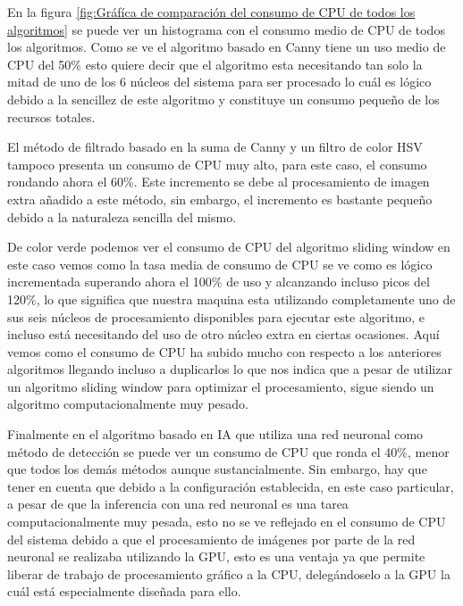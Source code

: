 \bigskip 

 En la figura \ref{fig:Gráfíca de comparación del consumo de CPU de todos los algoritmos}  se puede ver un histograma con el consumo medio de \ac{CPU} de todos los algoritmos. Como se ve el algoritmo basado en Canny tiene un uso medio de \ac{CPU} del 50\% esto quiere decir que el algoritmo esta necesitando tan solo la mitad de uno de los 6 núcleos del sistema para ser procesado lo cuál es lógico debido a la sencillez de este algoritmo y constituye un consumo pequeño de los recursos totales.
 
\bigskip

El método de filtrado basado en la suma de Canny y un filtro de color  HSV tampoco presenta un consumo de \ac{CPU} muy alto, para este caso, el consumo rondando ahora el 60\%. Este incremento se debe al procesamiento de imagen extra añadido a este método, sin embargo, el incremento es bastante pequeño debido a la naturaleza sencilla del mismo. 

 \bigskip
 De color verde podemos ver el consumo de \ac{CPU} del algoritmo sliding window en este caso vemos como la tasa media de consumo de \ac{CPU} se ve como es lógico incrementada superando ahora el 100\% de uso y alcanzando incluso picos del 120\%, lo que significa que nuestra maquina esta utilizando completamente uno de sus seis núcleos de procesamiento disponibles para ejecutar este algoritmo, e incluso está necesitando del uso de otro núcleo extra en ciertas ocasiones. Aquí vemos como el consumo de \ac{CPU} ha subido mucho con respecto a los anteriores algoritmos llegando incluso a duplicarlos lo que nos indica que a pesar de utilizar un algoritmo sliding window para optimizar el procesamiento, sigue siendo un algoritmo computacionalmente muy pesado.

\bigskip

Finalmente en el algoritmo basado en \ac{IA} que utiliza una red neuronal como método de detección se puede ver un consumo de \ac{CPU} que ronda el 40\%, menor que todos los demás métodos aunque sustancialmente. Sin embargo, hay que tener en cuenta que debido a la configuración establecida, en este caso particular, a pesar de que la inferencia con una red neuronal es una tarea computacionalmente muy pesada, esto no se ve reflejado en el consumo de \ac{CPU} del sistema debido a que el procesamiento de imágenes por parte de la red neuronal se realizaba utilizando la \ac{GPU}, esto es una ventaja ya que permite liberar de trabajo de procesamiento gráfico a la \ac{CPU}, delegándoselo a la \ac{GPU} la cuál está especialmente diseñada para ello.

